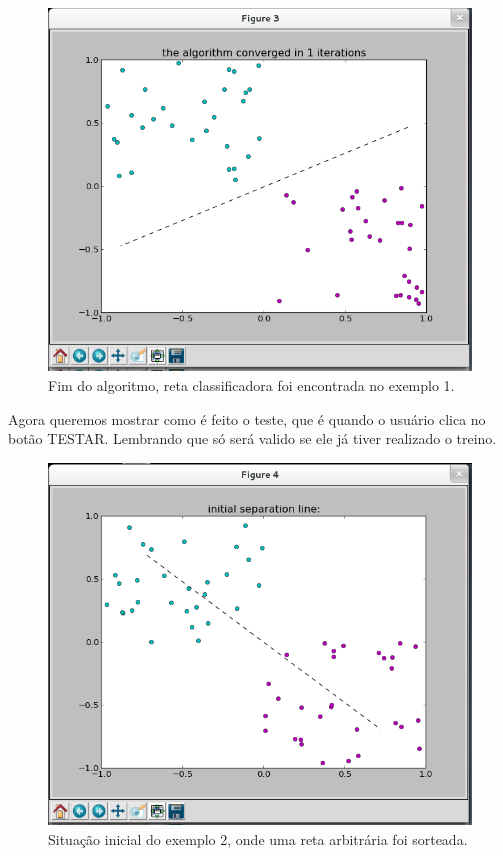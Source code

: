 \documentclass[brazil, a4paper]{article}
\begin{document}
\begin{itemize}
\begin{figure}[!htb]
\centering
\includegraphics[scale=0.25]{ex1-3.png}
\caption{Fim do algoritmo, reta classificadora foi encontrada no exemplo 1.}
\end{figure}

Agora queremos mostrar como é feito o teste, que é quando o usuário clica no botão TESTAR. Lembrando que só será valido se ele já tiver realizado o treino.

\newpage

\begin{figure}[!htb]
\centering
\includegraphics[scale=0.25]{ex2-1.png}
\caption{Situação inicial do exemplo 2, onde uma reta arbitrária foi sorteada.}
\end{figure}


\end{itemize}
\end{document}
